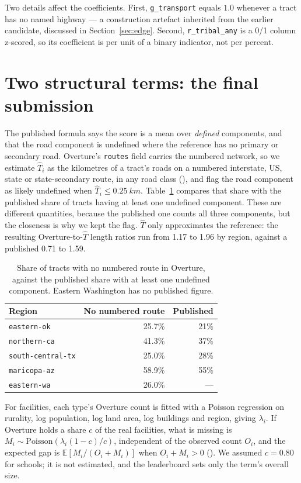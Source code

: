\documentclass[a4paper]{article}
\newcommand{\Ftribal}{\texttt{r\_tribal\_any}}
\newcommand{\Ftrans}{\texttt{g\_transport}}
\begin{document}
Two details affect the coefficients. First, \Ftrans{} equals $1.0$ whenever a
tract has no named highway --- a construction artefact inherited from the earlier candidate,
discussed in Section~\ref{sec:edge}. Second, \Ftribal{} is a 0/1 column z-scored, so its
coefficient is per unit of a binary indicator, not per percent.

\section{Two structural terms: the final submission}
\label{sec:struct}

The published formula says the score is a mean over \emph{defined} components, and that the road
component is undefined where the reference has no primary or secondary road. Overture's \texttt{routes}
field carries the numbered network, so we estimate $\hat{T}_i$ as the kilometres of a tract's roads on a numbered interstate, US, state or state-secondary
route, in any road class (), and flag the road component as likely
undefined when $\hat{T}_i\le\SI{0.25}{km}$. Table~\ref{tab:undef} compares that share with the published
share of tracts having at least one undefined component. These are different quantities, because the
published one counts all three components, but the closeness is why we kept the flag. $\hat{T}$ only
approximates the reference: the resulting Overture-to-$\hat{T}$ length ratios run from 1.17 to 1.96 by
region, against a published 0.71 to 1.59.

\begin{table}[htbp]
\centering
\small
\caption{Share of tracts with no numbered route in Overture, against the published share with at least
one undefined component. Eastern Washington has no published figure.}
\label{tab:undef}
\begin{tabular}{lrr}
\toprule
Region & No numbered route & Published \\
\midrule
\texttt{eastern-ok} & 25.7\% & 21\% \\
\texttt{northern-ca} & 41.3\% & 37\% \\
\texttt{south-central-tx} & 25.0\% & 28\% \\
\texttt{maricopa-az} & 58.9\% & 55\% \\
\texttt{eastern-wa} & 26.0\% & --- \\
\bottomrule
\end{tabular}
\end{table}

For facilities, each type's Overture count is fitted with a Poisson regression on rurality, log
population, log land area, log buildings and region, giving $\lambda_i$. If Overture holds a share $c$ of
the real facilities, what is missing is $M_i\sim\mathrm{Poisson}(\lambda_i(1-c)/c)$, independent of the
observed count $O_i$, and the expected gap is $\mathbb{E}[M_i/(O_i+M_i)]$ when $O_i+M_i>0$
(). We assumed $c=0.80$ for schools; it is not estimated,
and the leaderboard sets only the term's overall size.
\end{document}
